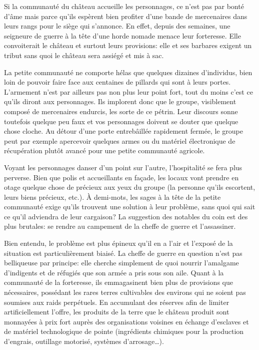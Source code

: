 Si la communauté du château accueille les personnages, ce n'est pas par bonté d'âme mais parce qu'ils espèrent bien profiter d'une bande de mercenaires dans leurs rangs pour le siège qui s'annonce.
En effet, depuis des semaines, une seigneure de guerre à la tête d'une horde nomade menace leur forteresse.
Elle convoiterait le château et surtout leurs provisions: elle et ses barbares exigent un tribut sans quoi le château sera assiégé et mis à sac.

La petite communauté ne comporte hélas que quelques dizaines d'individus, bien loin de pouvoir faire face aux centaines de pillards qui sont à leurs portes.
L'armement n'est par ailleurs pas non plus leur point fort, tout du moins c'est ce qu'ils diront aux personnages.
Ils implorent donc que le groupe, visiblement composé de mercenaires endurcis, les sorte de ce pétrin.
Leur discours sonne toutefois quelque peu faux et vos personnages doivent se douter que quelque chose cloche.
Au détour d'une porte entrebâillée rapidement fermée, le groupe peut par exemple apercevoir quelques armes ou du matériel électronique de récupération plutôt avancé pour une petite communauté agricole.

Voyant les personnages danser d'un point sur l'autre, l'hospitalité se fera plus perverse.
Bien que polis et accueillants en façade, les locaux vont prendre en otage quelque chose de précieux aux yeux du groupe (la personne qu'ils escortent, leurs biens précieux, etc.).
À demi-mots, les sages à la tête de la petite communauté exige qu'ils trouvent une solution à leur problème, sans quoi qui sait ce qu'il adviendra de leur cargaison?
La suggestion des notables du coin est des plus brutales: se rendre au campement de la cheffe de guerre et l'assassiner.

Bien entendu, le problème est plus épineux qu'il en a l'air et l'exposé de la situation est particulièrement biaisé.
La cheffe de guerre en question n'est pas belliqueuse par principe: elle cherche simplement de quoi nourrir l'amalgame d'indigents et de réfugiés que son armée a pris sous son aile.
Quant à la communauté de la forteresse, ils emmagasinent bien plus de provisions que nécessaires, possédant les rares terres cultivables des environs qui ne soient pas soumises aux raids perpétuels.
En accumulant des réserves afin de limiter artificiellement l'offre, les produits de la terre que le château produit sont monnayées à prix fort auprès des organisations voisines en échange d'esclaves et de matériel technologique de pointe (ingrédients chimiques pour la production d'engrais, outillage motorisé, systèmes d'arrosage\dots).

